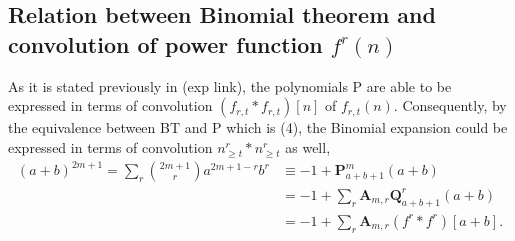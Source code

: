\documentclass[12pt, letterpaper]{amsart}
\theoremstyle{definition}
\theoremstyle{remark}
\numberwithin{equation}{section}
\begin{document}
\subsection{Relation between Binomial theorem and convolution of power function \texorpdfstring{$f^r(n)$}{f_r(n)}}
As it is stated previously in (exp link), the polynomials P are able to be expressed in terms of convolution $(f_{r,t} \ast f_{r,t})[n]$ of $f_{r,t}(n)$. Consequently, by the equivalence between BT and P which is (4), the Binomial expansion could be expressed in terms of convolution $n_{\geq t}^r \ast n_{\geq t}^r$ as well,
\begin{equation*}
\begin{split}
(a+b)^{2m+1}=\sum_{r} \binom{2m+1}{r} a^{2m+1-r} b^r
&\equiv -1+\mathbf{P}^{m}_{a+b+1}(a+b) \\
&= -1+\sum_{r}\mathbf{A}_{m,r}\mathbf{Q}^{r}_{a+b+1}(a+b)\\
&= -1+\sum\limits_{r}\mathbf{A}_{m,r} (f^{r} \ast f^{r})[a+b].
\end{split}
\end{equation*}
\end{document}

